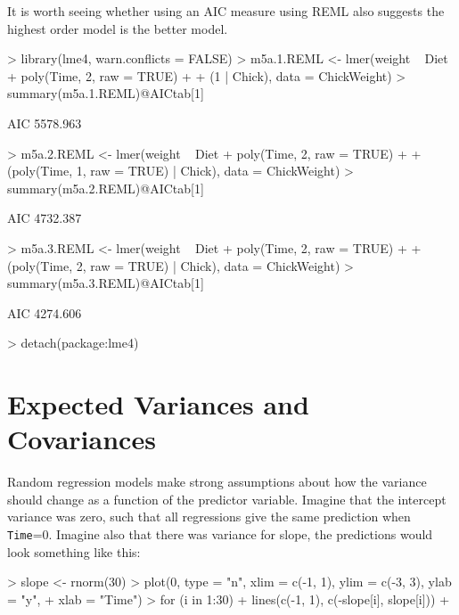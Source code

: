 \documentclass{article}
\begin{document}
It is worth seeing whether using an AIC measure using REML also suggests the highest order model is the better model. 

\begin{Schunk}
\begin{Sinput}
> library(lme4, warn.conflicts = FALSE)
> m5a.1.REML <- lmer(weight ~ Diet + poly(Time, 2, raw = TRUE) + 
+     (1 | Chick), data = ChickWeight)
> summary(m5a.1.REML)@AICtab[1]
\end{Sinput}
\begin{Soutput}
      AIC
 5578.963
\end{Soutput}
\begin{Sinput}
> m5a.2.REML <- lmer(weight ~ Diet + poly(Time, 2, raw = TRUE) + 
+     (poly(Time, 1, raw = TRUE) | Chick), data = ChickWeight)
> summary(m5a.2.REML)@AICtab[1]
\end{Sinput}
\begin{Soutput}
      AIC
 4732.387
\end{Soutput}
\begin{Sinput}
> m5a.3.REML <- lmer(weight ~ Diet + poly(Time, 2, raw = TRUE) + 
+     (poly(Time, 2, raw = TRUE) | Chick), data = ChickWeight)
> summary(m5a.3.REML)@AICtab[1]
\end{Sinput}
\begin{Soutput}
      AIC
 4274.606
\end{Soutput}
\begin{Sinput}
> detach(package:lme4)
\end{Sinput}
\end{Schunk}

\section{Expected Variances and Covariances}

Random regression models make strong assumptions about how the variance should change as a function of the predictor variable. Imagine that the intercept variance was zero, such that all regressions give the same prediction when \texttt{Time}=0. Imagine also that there was variance for slope, the predictions would look something like this:

\begin{Schunk}
\begin{Sinput}
> slope <- rnorm(30)
> plot(0, type = "n", xlim = c(-1, 1), ylim = c(-3, 3), ylab = "y", 
+     xlab = "Time")
> for (i in 1:30) {
+     lines(c(-1, 1), c(-slope[i], slope[i]))
+ }
\end{Sinput}
\end{Schunk}
\end{document}
